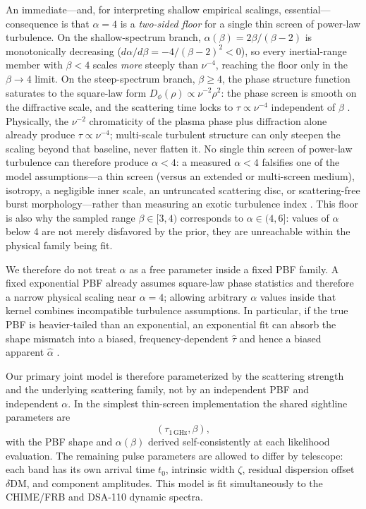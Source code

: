 An immediate---and, for interpreting shallow empirical scalings, essential---%
consequence is that $\alpha=4$ is a \emph{two-sided floor} for a single thin
screen of power-law turbulence. On the shallow-spectrum branch,
$\alpha(\beta)=2\beta/(\beta-2)$ is monotonically decreasing
($d\alpha/d\beta=-4/(\beta-2)^{2}<0$), so every inertial-range member with
$\beta<4$ scales \emph{more} steeply than $\nu^{-4}$, reaching the floor only
in the $\beta\to4$ limit. On the steep-spectrum branch, $\beta\ge4$, the phase
structure function saturates to the square-law form
$D_\phi(\rho)\propto\nu^{-2}\rho^{2}$: the phase screen is smooth on the
diffractive scale, and the scattering time locks to $\tau\propto\nu^{-4}$
independent of $\beta$ \citep{Rickett1990}. Physically, the $\nu^{-2}$
chromaticity of the plasma phase plus diffraction alone already produce
$\tau\propto\nu^{-4}$; multi-scale turbulent structure can only steepen the
scaling beyond that baseline, never flatten it. No single thin screen of
power-law turbulence can therefore produce $\alpha<4$: a measured
$\alpha<4$ falsifies one of the model assumptions---a thin screen (versus an
extended or multi-screen medium), isotropy, a negligible inner scale, an
untruncated scattering disc, or scattering-free burst morphology---rather than
measuring an exotic turbulence index \citep{Bhat2004,Cordes2025}. This floor is
also why the sampled range $\beta\in[3,4)$ corresponds to
$\alpha\in(4,6]$: values of $\alpha$ below 4 are not merely disfavored by the
prior, they are unreachable within the physical family being fit.

We therefore do not treat $\alpha$ as a free parameter inside a fixed PBF
family. A fixed exponential PBF already assumes square-law phase statistics and
therefore a narrow physical scaling near $\alpha=4$; allowing arbitrary
$\alpha$ values inside that kernel combines incompatible turbulence assumptions.
In particular, if the true PBF is heavier-tailed than an exponential, an
exponential fit can absorb the shape mismatch into a biased,
frequency-dependent $\widehat{\tau}$ and hence a biased apparent
$\widehat{\alpha}$ \citep{Cordes2025}.

Our primary joint model is therefore parameterized by the scattering strength and
the underlying scattering family, not by an independent PBF and independent
$\alpha$. In the simplest thin-screen implementation the shared sightline
parameters are
\begin{equation}
(\tau_{1\,\mathrm{GHz}},\beta),
\end{equation}
with the PBF shape and $\alpha(\beta)$ derived self-consistently at each
likelihood evaluation. The remaining pulse parameters are allowed to differ by
telescope: each band has its own arrival time $t_0$, intrinsic width $\zeta$,
residual dispersion offset $\delta\mathrm{DM}$, and component amplitudes. This
model is fit simultaneously to the CHIME/FRB and DSA-110 dynamic spectra.

